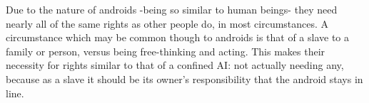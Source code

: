 Due to the nature of androids -being so similar to human beings- they need nearly all of the same rights as other people do, in most circumstances. A circumstance which may be common though to androids is that of a slave to a family or person, versus  being free-thinking and acting. This makes their necessity for rights similar to that of a confined AI: not actually needing any, because as a slave it should be its owner's responsibility that the android stays in line.
